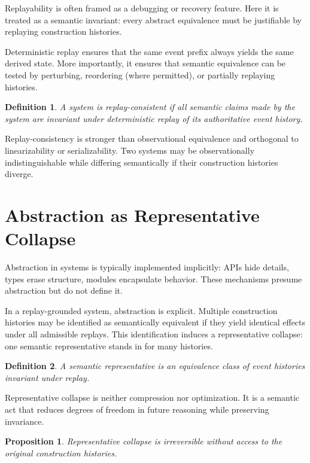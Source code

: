 \documentclass[11pt]{article}
\newtheorem{definition}{Definition}[section]
\newtheorem{proposition}{Proposition}[section]
\begin{document}
Replayability is often framed as a debugging or recovery feature. Here it is treated as a semantic invariant: every abstract equivalence must be justifiable by replaying construction histories.

Deterministic replay ensures that the same event prefix always yields the same derived state. More importantly, it ensures that semantic equivalence can be tested by perturbing, reordering (where permitted), or partially replaying histories.

\begin{definition}
A system is replay-consistent if all semantic claims made by the system are invariant under deterministic replay of its authoritative event history.
\end{definition}

Replay-consistency is stronger than observational equivalence and orthogonal to linearizability or serializability. Two systems may be observationally indistinguishable while differing semantically if their construction histories diverge.

\section{Abstraction as Representative Collapse}

Abstraction in systems is typically implemented implicitly: APIs hide details, types erase structure, modules encapsulate behavior. These mechanisms presume abstraction but do not define it.

In a replay-grounded system, abstraction is explicit. Multiple construction histories may be identified as semantically equivalent if they yield identical effects under all admissible replays. This identification induces a representative collapse: one semantic representative stands in for many histories.

\begin{definition}
A semantic representative is an equivalence class of event histories invariant under replay.
\end{definition}

Representative collapse is neither compression nor optimization. It is a semantic act that reduces degrees of freedom in future reasoning while preserving invariance.

\begin{proposition}
Representative collapse is irreversible without access to the original construction histories.
\end{proposition}
\end{document}

